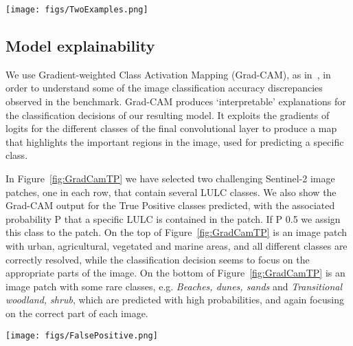 \documentclass[journal]{IEEEtran}
\begin{document}
 \begin{figure*}[!ht]
 \texttt{[image: figs/TwoExamples.png]}
 \centering
\caption{Examples of two challenging image patches, correctly classified. The first patch in Examples A \& B is the original Sentinel-2 image patch with the different LULC classes contained. The other patches are the output of Grad-CAM~\citep{Selvaraju_2017_ICCV} that we adopt to interpret which parts of the image were used by our network for deciding on each specific True Positive LULC class. P stands for the probability a specific LULC is contained in the patch.}
\label{fig:GradCamTP}
\end{figure*}

\subsection{Model explainability}
We use Gradient-weighted Class Activation Mapping (Grad-CAM), as in~\cite{Selvaraju_2017_ICCV}, in order to understand some of the image classification accuracy discrepancies observed in the benchmark. Grad-CAM produces `interpretable' explanations for the classification decisions of our resulting model. It exploits the gradients of logits for the different classes of the final convolutional layer to produce a map that  highlights the important regions in the image, used for predicting a specific class. 



In Figure~\ref{fig:GradCamTP} we have selected two challenging Sentinel-2 image patches, one in each row, that contain several LULC classes. We also show the Grad-CAM output for the True Positive classes predicted, with the associated probability P that a specific LULC is contained in the patch. If P  0.5 we assign this class to the patch. On the top of Figure~\ref{fig:GradCamTP} is an image patch with urban, agricultural, vegetated and marine areas, and all different classes are correctly resolved, while the classification decision seems to focus on the appropriate parts of the image. On the bottom of Figure~\ref{fig:GradCamTP} is an image patch with some rare classes, e.g. \textit{Beaches, dunes, sands} and \textit{Transitional woodland, shrub}, which are predicted with high probabilities, and again focusing on the correct part of each image.

 \begin{figure*}[h]
 \texttt{[image: figs/FalsePositive.png]}
\caption{Examples of image pairs with False Positive LULC {\color{blue} scene} classification. For each pair we show on the left the original Sentinel-2 image patch with all the LULC classes contained, and we show on the right the Grad-CAM~\citep{Selvaraju_2017_ICCV} output for a False Positive class. Red areas correspond to the part of the image patch used to make the False Positive prediction. P stands for the probability a specific LULC is contained in the patch.  }
\label{fig:GradCamFP}
\end{figure*}
\end{document}
